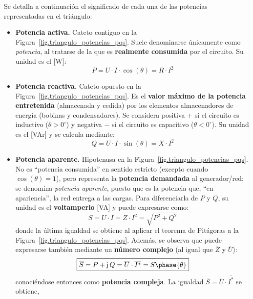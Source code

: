 Se detalla a continuación el significado de cada una de las potencias
representadas en el triángulo:
\begin{itemize}
\item \textbf{Potencia activa.} Cateto contiguo en la
  Figura~\ref{fig.triangulo_potencias_pqs}. Suele denominarse
  únicamente como \textit{potencia}, al tratarse de la que es
  \textbf{realmente consumida} por el circuito. Su unidad es el [W]:
  \begin{equation}\label{eq.Pactiva}
    \boxed{P = U\cdot I\cdot\cos(\theta) = R \cdot I^2}
  \end{equation}
\item \textbf{Potencia reactiva.} Cateto opuesto en la
  Figura~\ref{fig.triangulo_potencias_pqs}. Es el \textbf{valor máximo
    de la potencia entretenida} (almacenada y cedida) por los
  elementos almacenadores de energía (bobinas y condensadores). Se
  considera positiva $+$ si el circuito es inductivo
  ($\theta>0^\circ$) y negativa $-$ si el circuito es capacitivo
  ($\theta<0^\circ$). Su unidad es el [VAr] y se calcula mediante:
  \begin{equation}\label{eq.Qreactiva}
    \boxed{Q = U\cdot I\cdot\sin(\theta) = X \cdot I^2}
  \end{equation}
\item \textbf{Potencia aparente.} Hipotenusa en la
  Figura~\ref{fig.triangulo_potencias_pqs}. No es ``potencia
  consumida'' en sentido estricto (excepto cuando $\cos(\theta)=1$),
  pero representa la \textbf{potencia demandada} al generador/red; se
  denomina \textit{potencia aparente}, puesto que es la potencia que,
  ``en apariencia'', la red entrega a las cargas. Para diferenciarla
  de $P$ y $Q$, su unidad es el \textbf{voltamperio} [VA] y puede
  expresarse como:
  \begin{equation}\label{eq.Saparente}
    \boxed{S = U\cdot I= Z \cdot I^2=\sqrt{P^2+Q^2}}
  \end{equation}
  donde la última igualdad se obtiene al aplicar el teorema de
  Pitágoras a la Figura~\ref{fig.triangulo_potencias_pqs}. Además, se
  observa que puede expresarse también mediante un \textbf{número
    complejo} (al igual que $\overline{Z}$ y $\overline{U}$):
  \begin{equation}
    \boxed{\overline{S}=P+\mathrm{j}\,Q=\overline{U}\cdot \overline{I^*}=S\phase{\theta}}
  \end{equation}
  conociéndose entonces como \textbf{potencia compleja}. La igualdad
  $\overline{S}=\overline{U}\cdot \overline{I^*}$ se obtiene,

\end{itemize}
